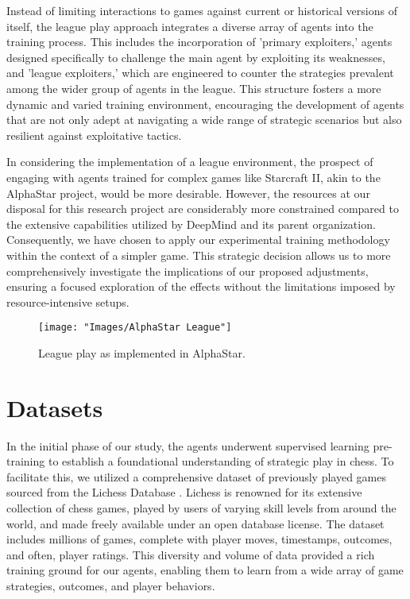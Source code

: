 \documentclass[journal]{IEEEtran}
\begin{document}
	Instead of limiting interactions to games against current or historical versions of itself, 
	the league play approach integrates a diverse array of agents into the training process. 
	This includes the incorporation of 'primary exploiters,' agents designed specifically to challenge the main agent by exploiting its weaknesses, 
	and 'league exploiters,' which are engineered to counter the strategies prevalent among the wider group of agents in the league. 
	This structure fosters a more dynamic and varied training environment, 
	encouraging the development of agents that are not only adept at navigating a wide range of strategic scenarios but also resilient against exploitative tactics.
	
	In considering the implementation of a league environment, the prospect of engaging with agents trained for complex games like Starcraft II, 
	akin to the AlphaStar project, would be more desirable. 
	However, the resources at our disposal for this research project are considerably more constrained compared to the 
	extensive capabilities utilized by DeepMind and its parent organization. 
	Consequently, we have chosen to apply our experimental training methodology within the context of a simpler game. 
	This strategic decision allows us to more comprehensively investigate the implications of our proposed adjustments, 
	ensuring a focused exploration of the effects without the limitations imposed by resource-intensive setups.
	
	\begin{figure}
		\centering
		\texttt{[image: "Images/AlphaStar League"]}
		\caption{League play as implemented in AlphaStar.}
		\label{fig:alphastar-league}
	\end{figure}
	
	\begin{comment}		
	\end{comment}

	\section{Datasets}
	\label{sec:dataset}
	In the initial phase of our study, the agents underwent supervised learning pre-training to establish a foundational understanding of strategic play in chess. 
	To facilitate this, we utilized a comprehensive dataset of previously played games sourced from the Lichess Database \cite{zotero-2247}.
	Lichess is renowned for its extensive collection of chess games, played by users of varying skill levels from around the world, 
	and made freely available under an open database license. 
	The dataset includes millions of games, complete with player moves, timestamps, outcomes, and often, player ratings. 
	This diversity and volume of data provided a rich training ground for our agents, enabling them to learn from a wide array of game strategies, outcomes, and player behaviors.
	
\end{document}
